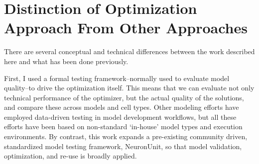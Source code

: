 







\section{Distinction of Optimization Approach From Other Approaches}
There are several conceptual and technical differences between the work described here and what has been done previously.

First, I used a formal testing framework--normally used to evaluate model quality--to drive the optimization itself.
This means that we can evaluate not only technical performance of the optimizer, but the actual quality of the solutions, and compare these across models and cell types.
Other modeling efforts have employed data-driven testing in model development workflows, but all these efforts have been based on non-standard ‘in-house’ model types and execution environments.
By contrast, this work expands a pre-existing community driven, standardized model testing framework, NeuronUnit, so that model validation, optimization, and re-use is broadly applied.

